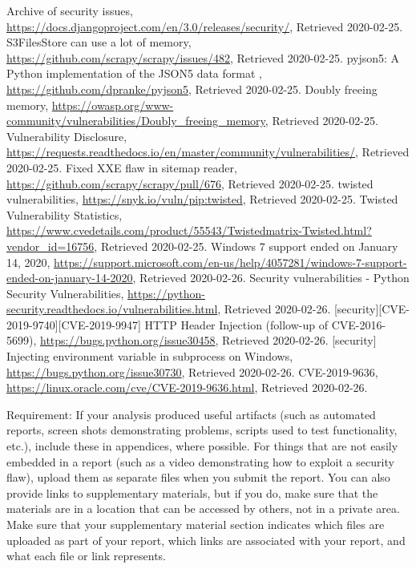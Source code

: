 \documentclass[12pt, a4paper]{article}
\newcommand{\citeWeb}[3]{#1, \url{#2}, Retrieved #3.}
\begin{document}
\begin{thebibliography}{99}
     \citeWeb{Archive of security issues}{https://docs.djangoproject.com/en/3.0/releases/security/}{2020-02-25}
     \citeWeb{S3FilesStore can use a lot of memory}{https://github.com/scrapy/scrapy/issues/482}{2020-02-25}
     \citeWeb{pyjson5: A Python implementation of the JSON5 data format
}{https://github.com/dpranke/pyjson5}{2020-02-25}
     \citeWeb{Doubly freeing memory}{https://owasp.org/www-community/vulnerabilities/Doubly_freeing_memory}{2020-02-25}
     \citeWeb{Vulnerability Disclosure}{https://requests.readthedocs.io/en/master/community/vulnerabilities/}{2020-02-25}
     \citeWeb{Fixed XXE flaw in sitemap reader}{https://github.com/scrapy/scrapy/pull/676}{2020-02-25}
     \citeWeb{twisted vulnerabilities}{https://snyk.io/vuln/pip:twisted}{2020-02-25}
     \citeWeb{Twisted Vulnerability Statistics}{https://www.cvedetails.com/product/55543/Twistedmatrix-Twisted.html?vendor_id=16756}{2020-02-25}
     \citeWeb{Windows 7 support ended on January 14, 2020}{https://support.microsoft.com/en-us/help/4057281/windows-7-support-ended-on-january-14-2020}{2020-02-26}
     \citeWeb{Security vulnerabilities - Python Security Vulnerabilities}{https://python-security.readthedocs.io/vulnerabilities.html}{2020-02-26}
     \citeWeb{[security][CVE-2019-9740][CVE-2019-9947] HTTP Header Injection (follow-up of CVE-2016-5699)}{https://bugs.python.org/issue30458}{2020-02-26}
     \citeWeb{[security] Injecting environment variable in subprocess on Windows}{https://bugs.python.org/issue30730}{2020-02-26}
     \citeWeb{CVE-2019-9636}{https://linux.oracle.com/cve/CVE-2019-9636.html}{2020-02-26}
\end{thebibliography}

Requirement: If your analysis produced useful artifacts (such as automated reports, screen shots demonstrating problems, scripts used to test functionality, etc.), include these in appendices, where possible. For things that are not easily embedded in a 
report (such as a video demonstrating how to exploit a security flaw), upload them as separate files when you submit the report. You can also provide links to supplementary materials, but if you do, make sure that the materials are in a location that can be accessed by others, not in a private area. Make sure that your supplementary material section indicates which files are uploaded as part of your report, which links are associated with your report, and what each file or link represents.  
 
\end{document}

